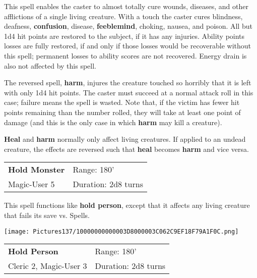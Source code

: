 \documentclass[a4paper,twoside,openany,10pt]{book}
\begin{document}
\begin{multicols}{2}
This spell enables the caster to almost totally cure wounds, diseases, and other afflictions of a single living creature. With a touch the caster cures blindness, deafness, \textbf{confusion}, disease, \textbf{feeblemind}, choking, nausea, and poison. All but 1d4 hit points are restored to the subject, if it has any injuries. Ability points losses are fully restored, if and only if those losses would be recoverable without this spell; permanent losses to ability scores are not recovered. Energy drain is also not affected by this spell.

The reversed spell, \textbf{harm}, injures the creature touched so horribly that it is left with only 1d4 hit points. The caster must succeed at a normal attack roll in this case; failure means the spell is wasted. Note that, if the victim has fewer hit points remaining than the number rolled, they will take at least one point of damage (and this is the only case in which \textbf{harm} may kill a creature).

\textbf{Heal} and \textbf{harm} normally only affect living creatures. If applied to an undead creature, the effects are reversed such that \textbf{heal} becomes \textbf{harm} and vice versa.


\smallskip\begin{flushleft} 
	\begin{tabularx}{0.45\textwidth}{@{}m{3.5cm}m{5.5cm}@{}} 
		\textbf{Hold Monster} & Range: 180'\\
Magic-User 5 &Duration: 2d8 turns\\
	\end{tabularx}\end{flushleft}

This spell functions like \textbf{hold person}, except that it affects any living creature that fails its save vs. Spells.


\begin{flushleft}
	\texttt{[image: Pictures137/10000000000003D8000003C062C9EF18F79A1F0C.png]}
\end{flushleft}


\smallskip\begin{flushleft} 
	\begin{tabularx}{0.45\textwidth}{@{}m{3.5cm}m{5.5cm}@{}} 
		\textbf{Hold Person} & Range: 180'\\
Cleric 2, Magic-User 3 & Duration: 2d8 turns\\
	\end{tabularx}\end{flushleft}


\end{multicols}
\end{document}
